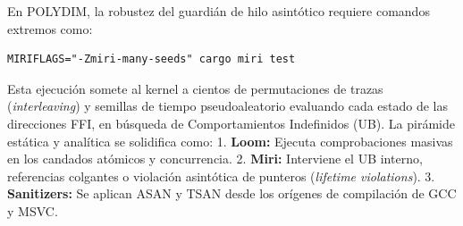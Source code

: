 En POLYDIM, la robustez del guardián de hilo asintótico requiere comandos extremos como:
\begin{verbatim}
MIRIFLAGS="-Zmiri-many-seeds" cargo miri test
\end{verbatim}

Esta ejecución somete al kernel a cientos de permutaciones de trazas (\textit{interleaving}) y semillas de tiempo pseudoaleatorio evaluando cada estado de las direcciones FFI, en búsqueda de Comportamientos Indefinidos (UB). La pirámide estática y analítica se solidifica como:
1. \textbf{Loom:} Ejecuta comprobaciones masivas en los candados atómicos y concurrencia.
2. \textbf{Miri:} Interviene el UB interno, referencias colgantes o violación asintótica de punteros (\textit{lifetime violations}).
3. \textbf{Sanitizers:} Se aplican ASAN y TSAN desde los orígenes de compilación de GCC y MSVC.
